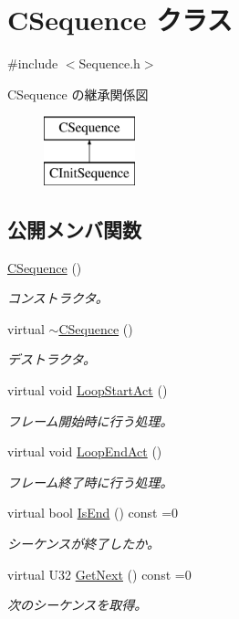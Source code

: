 \hypertarget{class_c_sequence}{}\section{C\+Sequence クラス}
\label{class_c_sequence}


{\ttfamily \#include $<$Sequence.\+h$>$}

C\+Sequence の継承関係図\begin{figure}[H]
\begin{center}
\leavevmode
\includegraphics[height=2.000000cm]{class_c_sequence}
\end{center}
\end{figure}
\subsection*{公開メンバ関数}
\begin{DoxyCompactItemize}
\item 
\hyperlink{class_c_sequence_a6cc3de702f301236a8a37a87ed725a67}{C\+Sequence} ()
\begin{DoxyCompactList}\small\item\em コンストラクタ。 \end{DoxyCompactList}\item 
virtual \hyperlink{class_c_sequence_ab3f7e5cb5fb63272423e0b5075189d62}{$\sim$\+C\+Sequence} ()
\begin{DoxyCompactList}\small\item\em デストラクタ。 \end{DoxyCompactList}\item 
virtual void \hyperlink{class_c_sequence_a0124977c5ae40f9289c7867ff71c743d}{Loop\+Start\+Act} ()
\begin{DoxyCompactList}\small\item\em フレーム開始時に行う処理。 \end{DoxyCompactList}\item 
virtual void \hyperlink{class_c_sequence_a0a2f5146bf33a4bd8c480d9da5a0538d}{Loop\+End\+Act} ()
\begin{DoxyCompactList}\small\item\em フレーム終了時に行う処理。 \end{DoxyCompactList}\item 
virtual bool \hyperlink{class_c_sequence_acec92faef8ee677063980776b4c242a1}{Is\+End} () const  =0
\begin{DoxyCompactList}\small\item\em シーケンスが終了したか。 \end{DoxyCompactList}\item 
virtual U32 \hyperlink{class_c_sequence_a9819cf065c49e5a8bee7f04f62d37d16}{Get\+Next} () const  =0
\begin{DoxyCompactList}\small\item\em 次のシーケンスを取得。 \end{DoxyCompactList}\end{DoxyCompactItemize}


